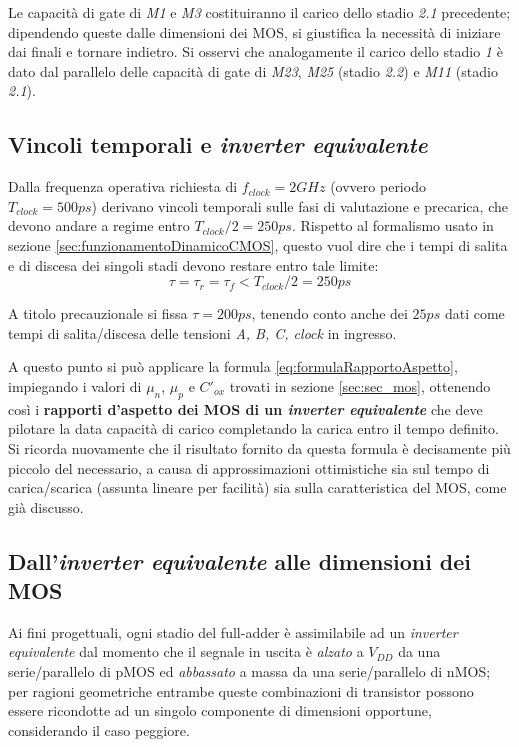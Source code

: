 Le capacità di gate di \textit{M1} e \textit{M3} costituiranno il carico dello stadio \textit{2.1} precedente; dipendendo queste dalle dimensioni dei MOS, si giustifica la necessità di iniziare dai finali e tornare indietro.
Si osservi che analogamente il carico dello stadio \textit{1} è dato dal parallelo delle capacità di gate di \textit{M23}, \textit{M25} (stadio \textit{2.2}) e \textit{M11} (stadio \textit{2.1}).

\subsection{Vincoli temporali e \textit{inverter equivalente}}
\label{subsec:specifiche}
Dalla frequenza operativa richiesta di $f_{clock} = 2GHz$ (ovvero periodo $T_{clock} = 500ps$) derivano vincoli temporali sulle fasi di valutazione e precarica, che devono andare a regime entro $T_{clock}/2 = 250ps$. Rispetto al formalismo usato in sezione \ref{sec:funzionamentoDinamicoCMOS}, questo vuol dire che i tempi di salita e di discesa dei singoli stadi devono restare entro tale limite: 
\begin{equation}
	\tau = \tau_{r} = \tau_{f} < T_{clock}/2 = 250ps
\end{equation}

A titolo precauzionale si fissa $\tau = 200ps$, tenendo conto anche dei $25ps$ dati come tempi di salita/discesa delle tensioni \textit{A, B, C, clock} in ingresso.

A questo punto si può applicare la formula \ref{eq:formulaRapportoAspetto}, impiegando i valori di $\mu _n$, $\mu _p$ e $C'_{ox}$ trovati in sezione \ref{sec:sec_mos}, ottenendo così i \textbf{rapporti d'aspetto dei MOS di un \textit{inverter equivalente}} che deve pilotare la data capacità di carico completando la carica entro il tempo definito. Si ricorda nuovamente che il risultato fornito da questa formula è decisamente più piccolo del necessario, a causa di approssimazioni ottimistiche sia sul tempo di carica/scarica (assunta lineare per facilità) sia sulla caratteristica del MOS, come già discusso.

\subsection{Dall'\textit{inverter equivalente} alle dimensioni dei MOS}
\label{subsec:daInverterAMOS}
Ai fini progettuali, ogni stadio del full-adder è assimilabile ad un \textit{inverter equivalente} dal momento che il segnale in uscita è \textit{alzato} a $V_{DD}$ da una serie/parallelo di pMOS ed \textit{abbassato} a massa da una serie/parallelo di nMOS; per ragioni geometriche entrambe queste combinazioni di transistor possono essere ricondotte ad un singolo componente di dimensioni opportune, considerando il caso peggiore.

